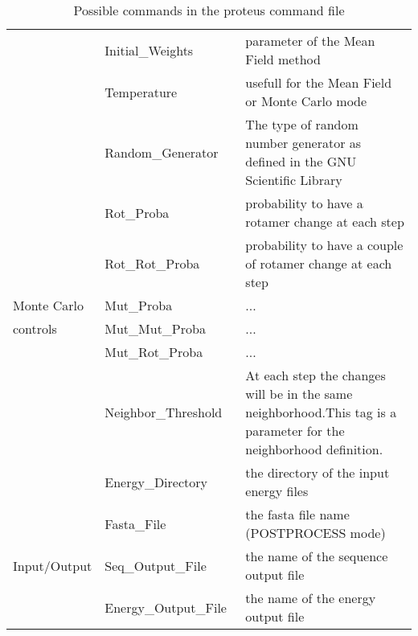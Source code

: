 \documentclass[a4paper,12pt]{article}
\begin{document}
\begin{table}[!htbp]
\begin{tabular}{|p{0.2\linewidth}|p{0.35\linewidth}|p{0.45\linewidth}|}
                         & Initial\_Weights &  parameter of the Mean Field method \\              \cline{2-3} 
                         & Temperature & usefull for the Mean Field or Monte Carlo mode  \\          \hline     
                         & Random\_Generator &  The type of random number generator as defined in the GNU Scientific Library \\ \cline{2-3}
                         & Rot\_Proba &  probability to have a rotamer change at each step \\              
                         & Rot\_Rot\_Proba &  probability to have a couple of rotamer change at each step\\          
        Monte Carlo      & Mut\_Proba &  ... \\              
            controls     & Mut\_Mut\_Proba & ... \\              
                         & Mut\_Rot\_Proba & ... \\             \cline{2-3}  
                         & Neighbor\_Threshold & At each step the changes will be in the same neighborhood.This tag is a parameter for the neighborhood definition.\\   \hline           
                         & Energy\_Directory & the directory of the input energy files\\    \cline{2-3}                
                         & Fasta\_File & the fasta file name (POSTPROCESS mode)\\    \cline{2-3}             
        Input/Output     & Seq\_Output\_File & the name of the sequence output file\\    \cline{2-3}             
                         & Energy\_Output\_File & the name of the energy output file  \\   \hline              

      \end{tabular} 

      \caption{ Possible commands in the proteus command file}      

      \label{table1}

  \end{table}
\end{document}
